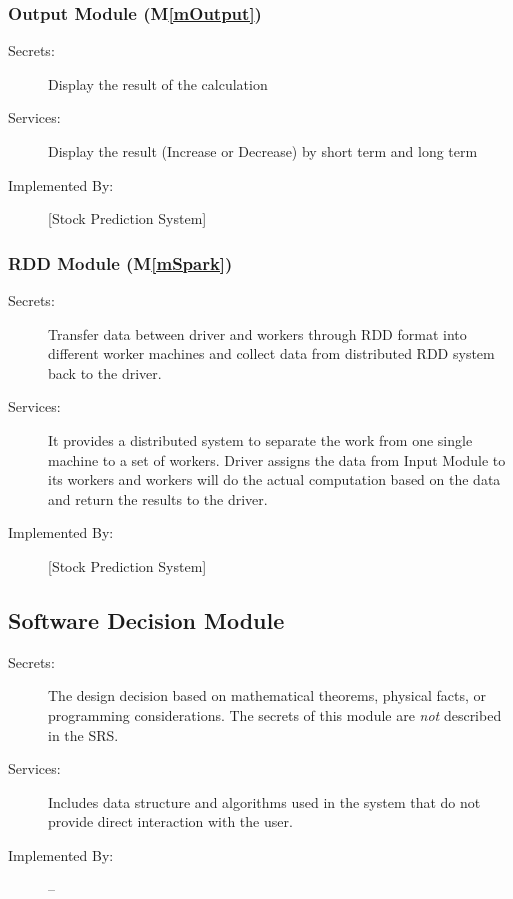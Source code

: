 \documentclass[12pt, titlepage]{article}
\newcommand{\mref}[1]{M\ref{#1}}
\begin{document}
\subsubsection{Output Module (\mref{mOutput})}
\begin{description}
\item[Secrets:] Display the result of the calculation
\item[Services:] Display the result (Increase or Decrease) by short term and long term
\item[Implemented By:] [Stock Prediction System]
\end{description}

\subsubsection{RDD Module (\mref{mSpark})}
\begin{description}
\item[Secrets:] Transfer data between driver and workers through RDD format into different worker machines and collect data from distributed RDD system back to the driver.

\item[Services:] It provides a distributed system to separate the work from one
  single machine to a set of workers. Driver assigns the data from Input Module
  to its workers and workers will do the actual computation based on the data
  and return the results to the driver. 

\item[Implemented By:] [Stock Prediction System]
\end{description}

\subsection{Software Decision Module}

\begin{description}
\item[Secrets:] The design decision based on mathematical theorems, physical
facts, or programming considerations. The secrets of this module are
\emph{not} described in the SRS.
\item[Services:] Includes data structure and algorithms used in the system that
do not provide direct interaction with the user. 
\item[Implemented By:] --
\end{description}
\end{document}
